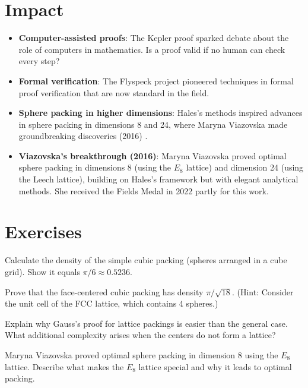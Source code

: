 \section{Impact}

\begin{itemize}
\item \textbf{Computer-assisted proofs}: The Kepler proof sparked debate about the role of computers in mathematics. Is a proof valid if no human can check every step?
\item \textbf{Formal verification}: The Flyspeck project pioneered techniques in formal proof verification that are now standard in the field.
\item \textbf{Sphere packing in higher dimensions}: Hales's methods inspired advances in sphere packing in dimensions 8 and 24, where Maryna Viazovska made groundbreaking discoveries (2016) \cite{viazovska2017,cohn2017}.
\item \textbf{Viazovska's breakthrough (2016)}: Maryna Viazovska proved optimal sphere packing in dimensions 8 (using the $E_8$ lattice) and dimension 24 (using the Leech lattice), building on Hales's framework but with elegant analytical methods. She received the Fields Medal in 2022 partly for this work.
\end{itemize}

\section{Exercises}

\begin{exercise}[Basic]
Calculate the density of the simple cubic packing (spheres arranged in a cube grid). Show it equals $\pi/6 \approx 0.5236$.
\end{exercise}

\begin{exercise}[Intermediate]
Prove that the face-centered cubic packing has density $\pi/\sqrt{18}$. (Hint: Consider the unit cell of the FCC lattice, which contains 4 spheres.)
\end{exercise}

\begin{exercise}[Challenge]
Explain why Gauss's proof for lattice packings is easier than the general case. What additional complexity arises when the centers do not form a lattice?
\end{exercise}

\begin{exercise}
Maryna Viazovska proved optimal sphere packing in dimension 8 using the $E_8$ lattice. Describe what makes the $E_8$ lattice special and why it leads to optimal packing.
\end{exercise}


